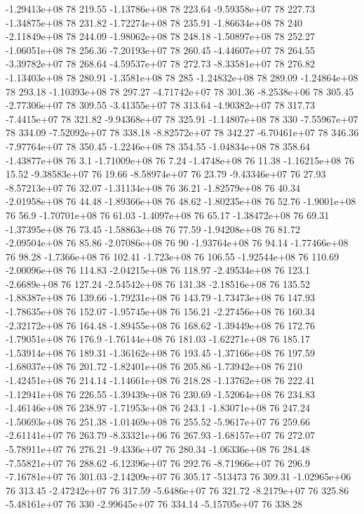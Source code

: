 -1.29413e+08 78 219.55
-1.13786e+08 78 223.64
-9.59358e+07 78 227.73
-1.34875e+08 78 231.82
-1.72274e+08 78 235.91
-1.86634e+08 78 240
-2.11849e+08 78 244.09
-1.98062e+08 78 248.18
-1.50897e+08 78 252.27
-1.06051e+08 78 256.36
-7.20193e+07 78 260.45
-4.44607e+07 78 264.55
-3.39782e+07 78 268.64
-4.59537e+07 78 272.73
-8.33581e+07 78 276.82
-1.13403e+08 78 280.91
-1.3581e+08 78 285
-1.24832e+08 78 289.09
-1.24864e+08 78 293.18
-1.10393e+08 78 297.27
-4.71742e+07 78 301.36
-8.2538e+06 78 305.45
-2.77306e+07 78 309.55
-3.41355e+07 78 313.64
-4.90382e+07 78 317.73
-7.4415e+07 78 321.82
-9.94368e+07 78 325.91
-1.14807e+08 78 330
-7.55967e+07 78 334.09
-7.52092e+07 78 338.18
-8.82572e+07 78 342.27
-6.70461e+07 78 346.36
-7.97764e+07 78 350.45
-1.2246e+08 78 354.55
-1.04834e+08 78 358.64
-1.43877e+08 76 3.1
-1.71009e+08 76 7.24
-1.4748e+08 76 11.38
-1.16215e+08 76 15.52
-9.38583e+07 76 19.66
-8.58974e+07 76 23.79
-9.43346e+07 76 27.93
-8.57213e+07 76 32.07
-1.31134e+08 76 36.21
-1.82579e+08 76 40.34
-2.01958e+08 76 44.48
-1.89366e+08 76 48.62
-1.80235e+08 76 52.76
-1.9001e+08 76 56.9
-1.70701e+08 76 61.03
-1.4097e+08 76 65.17
-1.38472e+08 76 69.31
-1.37395e+08 76 73.45
-1.58863e+08 76 77.59
-1.94208e+08 76 81.72
-2.09504e+08 76 85.86
-2.07086e+08 76 90
-1.93764e+08 76 94.14
-1.77466e+08 76 98.28
-1.7366e+08 76 102.41
-1.723e+08 76 106.55
-1.92544e+08 76 110.69
-2.00096e+08 76 114.83
-2.04215e+08 76 118.97
-2.49534e+08 76 123.1
-2.6689e+08 76 127.24
-2.54542e+08 76 131.38
-2.18516e+08 76 135.52
-1.88387e+08 76 139.66
-1.79231e+08 76 143.79
-1.73473e+08 76 147.93
-1.78635e+08 76 152.07
-1.95745e+08 76 156.21
-2.27456e+08 76 160.34
-2.32172e+08 76 164.48
-1.89455e+08 76 168.62
-1.39449e+08 76 172.76
-1.79051e+08 76 176.9
-1.76144e+08 76 181.03
-1.62271e+08 76 185.17
-1.53914e+08 76 189.31
-1.36162e+08 76 193.45
-1.37166e+08 76 197.59
-1.68037e+08 76 201.72
-1.82401e+08 76 205.86
-1.73942e+08 76 210
-1.42451e+08 76 214.14
-1.14661e+08 76 218.28
-1.13762e+08 76 222.41
-1.12941e+08 76 226.55
-1.39439e+08 76 230.69
-1.52064e+08 76 234.83
-1.46146e+08 76 238.97
-1.71953e+08 76 243.1
-1.83071e+08 76 247.24
-1.50693e+08 76 251.38
-1.01469e+08 76 255.52
-5.9617e+07 76 259.66
-2.61141e+07 76 263.79
-8.33321e+06 76 267.93
-1.68157e+07 76 272.07
-5.78911e+07 76 276.21
-9.4336e+07 76 280.34
-1.06336e+08 76 284.48
-7.55821e+07 76 288.62
-6.12396e+07 76 292.76
-8.71966e+07 76 296.9
-7.16781e+07 76 301.03
-2.14209e+07 76 305.17
-513473 76 309.31
-1.02965e+06 76 313.45
-2.47242e+07 76 317.59
-5.6486e+07 76 321.72
-8.2179e+07 76 325.86
-5.48161e+07 76 330
-2.99645e+07 76 334.14
-5.15705e+07 76 338.28

